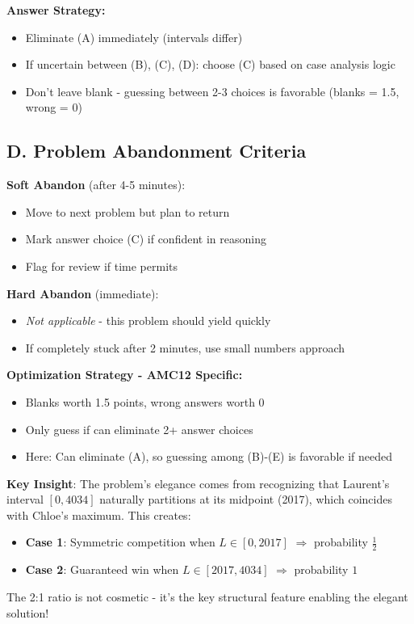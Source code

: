\documentclass[]{article}
\begin{document}
\begin{competitionbox}
\textbf{Answer Strategy:}
\begin{itemize}[leftmargin=*]
    \item Eliminate (A) immediately (intervals differ)
    \item If uncertain between (B), (C), (D): choose (C) based on case analysis logic
    \item Don't leave blank - guessing between 2-3 choices is favorable (blanks = 1.5, wrong = 0)
\end{itemize}

\subsection*{D. Problem Abandonment Criteria}

\textbf{Soft Abandon} (after 4-5 minutes):
\begin{itemize}[leftmargin=*]
    \item Move to next problem but plan to return
    \item Mark answer choice (C) if confident in reasoning
    \item Flag for review if time permits
\end{itemize}

\textbf{Hard Abandon} (immediate):
\begin{itemize}[leftmargin=*]
    \item \textit{Not applicable} - this problem should yield quickly
    \item If completely stuck after 2 minutes, use small numbers approach
\end{itemize}

\textbf{Optimization Strategy - AMC12 Specific:}
\begin{itemize}[leftmargin=*]
    \item Blanks worth 1.5 points, wrong answers worth 0
    \item Only guess if can eliminate 2+ answer choices
    \item Here: Can eliminate (A), so guessing among (B)-(E) is favorable if needed
\end{itemize}
\end{competitionbox}

\begin{keyinsightbox}
\textbf{Key Insight}: The problem's elegance comes from recognizing that Laurent's interval $[0, 4034]$ naturally partitions at its midpoint (2017), which coincides with Chloe's maximum. This creates:
\begin{itemize}
    \item \textbf{Case 1}: Symmetric competition when $L \in [0, 2017]$ $\Rightarrow$ probability $\frac{1}{2}$
    \item \textbf{Case 2}: Guaranteed win when $L \in [2017, 4034]$ $\Rightarrow$ probability $1$
\end{itemize}
The 2:1 ratio is not cosmetic - it's the key structural feature enabling the elegant solution!
\end{keyinsightbox}
\end{document}
